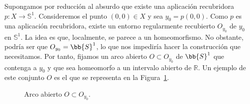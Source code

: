 \documentclass[12pt]{article}
\begin{document}
\begin{ejercicio}
\begin{enumerate}[label=\alph*)]
\begin{description}
                    Supongamos por reducción al absurdo que existe una aplicación recubridora $p:X\to \mathbb{S}^1$. Consideremos el punto $(0,0)\in X$ y sea $y_0 = p(0,0)$. Como $p$ es una aplicación recubridora, existe un entorno regularmente recubierto $O_{y_0}$ de $y_0$ en $\mathbb{S}^1$. La idea es que, localmente, se parece a un homeomorfismo. No obstante, podría ser que $O_{y_0}=\bb{S}^1$, lo que nos impediría hacer la construcción que necesitamos. Por tanto, fijamos un arco abierto $O\subset O_{y_0}$ de $\bb{S}^1$ que contenga a $y_0$ y que sea homeomorfo a un intervalo abierto de $\mathbb{R}$. Un ejemplo de este conjunto $O$ es el que se representa en la Figura~\ref{fig:arco}.
                    \begin{figure}[h]
                        \centering
                        \caption{Arco abierto $O\subset O_{y_0}$.}
                        \label{fig:arco}
                    \end{figure}


\end{description}
\end{enumerate}
\end{ejercicio}
\end{document}
